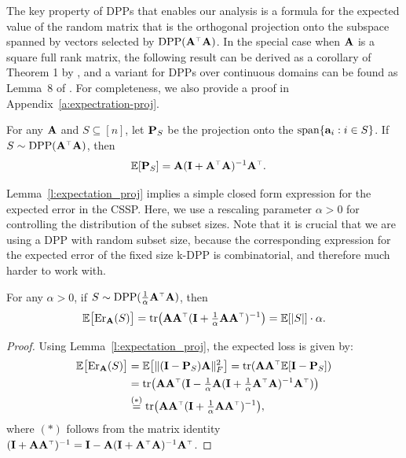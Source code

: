 \documentclass{article}
\begin{document}
The key property of DPPs that enables our analysis is a
formula for the expected value of the random matrix that is the orthogonal projection onto the
subspace spanned by vectors selected by $\DPP(\A^\top\A)$.
In the special case when $\A$ is a square full rank matrix, the
following result can be derived as a corollary of Theorem 1 by
\citet{randomized-newton}, and a variant for DPPs over
continuous domains can be found as Lemma~8 of
\citet{surrogate-design}. For completeness, we also provide a proof in
Appendix~\ref{a:expectration-proj}.
\begin{lemma}\label{l:expectation_proj}
  For any $\A$ and $S\subseteq [n]$, let $\P_S$ be the  
projection onto the $\mathrm{span}\{\a_i:i\in S\}$. If $S\sim \DPP(\A^\top\A)$, then
\begin{align*}
  \E[\P_S] & = \A(\I+\A^\top\A)^{-1}\A^\top.
\end{align*}
\end{lemma}
Lemma~\ref{l:expectation_proj} implies a simple closed form expression for
the expected error in the CSSP. Here, we use a
rescaling parameter $\alpha>0$ for controlling
the distribution of the subset sizes. Note that it is crucial that we
are using a DPP with random subset size, because the corresponding
expression for the expected error of the fixed size k-DPP is
combinatorial, and therefore much harder to work with.
\begin{lemma}\label{l:expected-error}
  For any $\alpha>0$, if $S\sim
  \DPP(\frac1\alpha\A^\top\A)$, then
  \begin{align*}
    \E\big[\Er_\A(S)\big] =
    \tr\big(\A\A^\top(\I+\tfrac1\alpha\A\A^\top)^{-1}\big) = \E[|S|]\cdot\alpha.
  \end{align*}
\end{lemma}
\begin{proof}
Using Lemma~\ref{l:expectation_proj}, the expected loss is given by:
	\begin{align*}
          \E\big[\Er_\A(S)\big]
          &= \E\big[ \|(\I-\P_S)\A\|_F^2\big]
            = \tr(\A\A^\top\E[\I-\P_S]) \\
          &=\tr\big(\A\A^\top
            (\I-\tfrac1\alpha\A(\I+\tfrac1\alpha\A^\top\A)^{-1}\A^\top)\big)\\
          &\overset{(*)}{=}\tr\big(\A\A^\top(\I+\tfrac1\alpha\A\A^\top)^{-1}\big),
	\end{align*}
where $(*)$ follows from the matrix identity
$(\I+\A\A^\top)^{-1}=\I-\A(\I+\A^\top\A)^{-1}\A^\top$. 
\end{proof}
\end{document}
